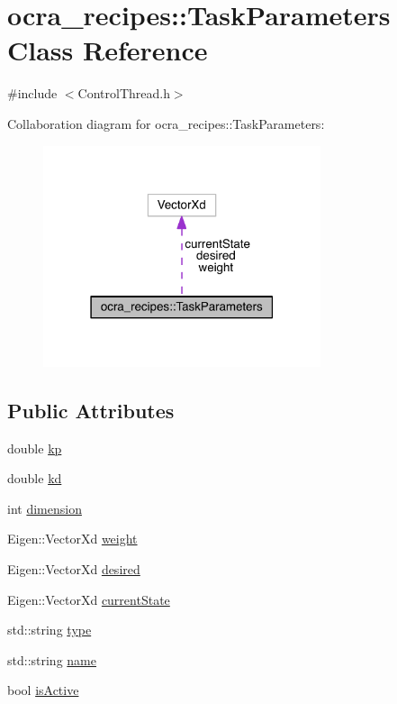 \hypertarget{classocra__recipes_1_1TaskParameters}{}\section{ocra\+\_\+recipes\+:\+:Task\+Parameters Class Reference}
\label{classocra__recipes_1_1TaskParameters}


{\ttfamily \#include $<$Control\+Thread.\+h$>$}



Collaboration diagram for ocra\+\_\+recipes\+:\+:Task\+Parameters\+:\nopagebreak
\begin{figure}[H]
\begin{center}
\leavevmode
\includegraphics[width=231pt]{d3/dc8/classocra__recipes_1_1TaskParameters__coll__graph}
\end{center}
\end{figure}
\subsection*{Public Attributes}
\begin{DoxyCompactItemize}
\item 
double \hyperlink{classocra__recipes_1_1TaskParameters_a644ed196f6bf867e46d7faab9ac287b3}{kp}
\item 
double \hyperlink{classocra__recipes_1_1TaskParameters_a8a90d9db17c0faeb26624899264eec9e}{kd}
\item 
int \hyperlink{classocra__recipes_1_1TaskParameters_a9102d4eee6b4dedb4bfb9181d348ed9c}{dimension}
\item 
Eigen\+::\+Vector\+Xd \hyperlink{classocra__recipes_1_1TaskParameters_aa960ee789e002d17f148a67cb8b35251}{weight}
\item 
Eigen\+::\+Vector\+Xd \hyperlink{classocra__recipes_1_1TaskParameters_a1dbe7dbb189079f4c8b7cd8f60a3b33e}{desired}
\item 
Eigen\+::\+Vector\+Xd \hyperlink{classocra__recipes_1_1TaskParameters_a323bf15f03055fcbf07f865ba9074381}{current\+State}
\item 
std\+::string \hyperlink{classocra__recipes_1_1TaskParameters_a8c62a820309b362ba4ce8c515a66aff4}{type}
\item 
std\+::string \hyperlink{classocra__recipes_1_1TaskParameters_a8d9b23fed4d4207bed2b48625acb8910}{name}
\item 
bool \hyperlink{classocra__recipes_1_1TaskParameters_a1e4df01753f82bc359f9632817e61e2b}{is\+Active}
\end{DoxyCompactItemize}
